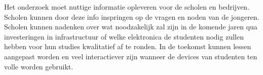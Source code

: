 \documentclass[fleqn,10pt]{voorstel}
\begin{document}
Het onderzoek moet nuttige informatie opleveren voor de scholen en bedrijven. Scholen kunnen door deze info inspringen op de vragen en noden van de jongeren. Scholen kunnen nadenken over wat noodzakelijk zal zijn in de komende jaren qua investeringen in infrastructuur of welke elektronica de studenten nodig zullen hebben voor hun studies kwalitatief af te ronden. In de toekomst kunnen lessen aangepast worden en veel interactiever zijn wanneer de devices van studenten ten volle worden gebruikt. 


\printbibliography
\end{document}
